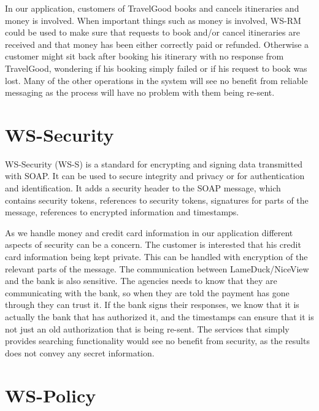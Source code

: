 In our application, customers of TravelGood books and cancels itineraries and money is involved. When important things such as money is involved, WS-RM could be used to make sure that requests to book and/or cancel itineraries are received and that money has been either correctly paid or refunded. Otherwise a customer might sit back after booking his itinerary with no response from TravelGood, wondering if his booking simply failed or if his request to book was lost. Many of the other operations in the system will see no benefit from reliable messaging as the process will have no problem with them being re-sent.


\section{WS-Security}
\kim

\noindent
WS-Security (WS-S) is a standard for encrypting and signing data transmitted with SOAP. It can be used to secure integrity and privacy or for authentication and identification. It adds a security header to the SOAP message, which contains security tokens, references to security tokens, signatures for parts of the message, references to encrypted information and timestamps.

As we handle money and credit card information in our application different aspects of security can be a concern. The customer is interested that his credit card information being kept private. This can be handled with encryption of the relevant parts of the message. The communication between LameDuck/NiceView and the bank is also sensitive. The agencies needs to know that they are communicating with the bank, so when they are told the payment has gone through they can trust it. If the bank signs their responses, we know that it is actually the bank that has authorized it, and the timestamps can ensure that it is not just an old authorization that is being re-sent. The services that simply provides searching functionality would see no benefit from security, as the results does not convey any secret information.

\section{WS-Policy}
\pet

